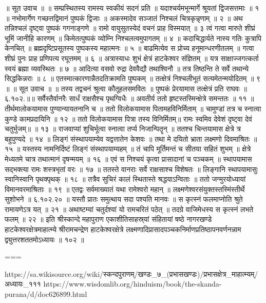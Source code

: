 ॥ सूत उवाच ॥ ॥
सम्प्रस्थितस्य रामस्य स्वकीयं सदनं प्रति ॥
यदाश्चर्यमभून्मार्गे श्रूयतां द्विजसत्तमाः ॥ १ ॥
नभोमार्गेण गच्छत्तद्विमानं पुष्पकं द्विजाः ॥
अकस्मादेव सञ्जातं निश्चलं चित्रकृन्नृणाम् ॥ २ ॥
अथ तन्निश्चलं दृष्ट्वा पुष्पकं गगनाङ्गणे ॥
रामो वायुसुतस्येदं वचनं प्राह विस्मयात् ॥ ३
त्वं गत्वा मारुते शीघ्रं भूमिं जानीहि कारणम् ॥
किमेतत्पुष्पकं व्योम्नि निश्चलत्वमुपागतम् ॥ ४ ॥
कदाचिद्धार्यते नास्य गतिः कुत्रापि केनचित् ॥
ब्रह्मदृष्टिप्रसूतस्य पुष्पकस्य महात्मनः ॥ ५ ॥
बाढमित्येव स प्रोच्य हनूमान्धरणीतलम् ॥
गत्वा शीघ्रं पुनः प्राह प्रणिपत्य रघूत्तमम् ॥ ६ ॥
अत्रास्याधः शुभं क्षेत्रं हाटकेश्वर संज्ञितम् ॥
यत्र साक्षाज्जगत्कर्ता स्वयं ब्रह्मा व्यवस्थितः ॥ ७ ॥
आदित्या वसवो रुद्रा देववैद्यौ तथाश्विनौ ॥
तत्र तिष्ठन्ति ते सर्वे तथान्ये सिद्धकिन्नराः ॥ ८ ॥
एतस्मात्कारणान्नैतदतिक्रामति पुष्पकम् ॥
तत्क्षेत्रं निश्चलीभूतं सत्यमेतन्मयोदितम् ॥ ९ ॥
॥ सूत उवाच ॥ ॥
तस्य तद्वचनं श्रुत्वा कौतूहलसमवितः ॥
पुष्पकं प्रेरयामास तत्क्षेत्रं प्रति राघवः ॥६.१०२.॥॥
सर्वैस्तैर्वानरैः सार्धं राक्षसैश्च पृथग्विधैः ॥
अवतीर्य ततो हृष्टस्तस्मिन्क्षेत्रे समन्ततः ॥ ११ ॥
तीर्थमालोकयामास पुण्यान्यायतनानि च ॥
ततो विलोकयामास पितामहविनिर्मिताम् ॥
चामुण्डां तत्र च स्नात्वा कुण्डे कामप्रदायिनि ॥ १२ ॥
ततो विलोकयामास पित्रा तस्य विनिर्मितम्॥
रामः स्वमिव देवेशं दृष्ट्वा देवं चतुर्भुजम्॥ ॥ १३ ॥
राजवाप्यां शुचिर्भूत्वा स्नात्वा तर्प्य निजान्पितॄन् ॥
ततश्च चिन्तयामास क्षेत्रे त्र बहुपुण्यदे ॥ १४ ॥
लिङ्गं संस्थापयाम्येव यद्वत्तातेन केशवः ॥
तथा मे दयितो भ्राता लक्ष्मणो दिवमाश्रितः ॥ १५ ॥
यस्तस्य नामनिर्दिष्टं लिङ्गं संस्थापयाम्यहम् ॥
तं चापि मूर्तिमन्तं च सीतया सहितं शुभम् ॥
क्षेत्रे मेध्यतमे चात्र तथात्मानं दृषन्मयम् ॥ १६ ॥
एवं स निश्चयं कृत्वा प्रासादानां च पञ्चकम् ॥
स्थापयामास सद्भक्त्या रामः शस्त्रभृतां वरः ॥ १७ ॥
ततस्ते वानराः सर्वे राक्षसाश्च विशेषतः ॥
लिङ्गानि स्थापयामासुः स्वानिस्वानि पृथक्पृथक् ॥ १८ ॥
तत्रैव सुचिरं कालं स्थितास्ते श्रद्धयाऽन्विताः ॥
ततो जग्मुरयोध्यायां विमानवरमाश्रिताः ॥ १९ ॥
एतद्वः सर्वमाख्यातं यथा रामेश्वरो महान् ॥
लक्ष्मणेश्वरसंयुक्तस्तस्मिंस्तीर्थे सुशोभने ॥ ६.१०२.२० ॥
यस्तौ प्रातः समुत्थाय सदा पश्यति मानवः ॥
स कृत्स्नं फलमाप्नोति श्रुते रामायणेऽत्र यत् ॥ २१ ॥
अथाष्टम्यां चतुर्दश्यां यो रामचरितं पठेत् ॥
तदग्रे वाजिमेधस्य स कृत्स्नं लभते फलम् ॥ २२ ॥
इति श्रीस्कान्दे महापुराण एकाशीतिसाहस्र्यां संहितायां षष्ठे नागरखण्डे हाटकेश्वरक्षेत्रमाहात्म्ये श्रीरामचन्द्रेण हाटकेश्वरक्षेत्रे लक्ष्मणादिप्रासादपञ्चकनिर्माणप्रतिष्ठापनवर्णनन्नाम द्व्युत्तरशततमोऽध्यायः ॥ १०२ ॥

===

https://sa.wikisource.org/wiki/स्कन्दपुराणम्/खण्डः_७_(प्रभासखण्डः)/प्रभासक्षेत्र_माहात्म्यम्/अध्यायः_१११
https://www.wisdomlib.org/hinduism/book/the-skanda-purana/d/doc626899.html

